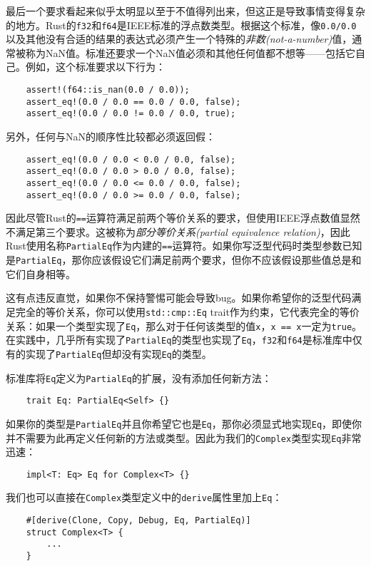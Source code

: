 最后一个要求看起来似乎太明显以至于不值得列出来，但这正是导致事情变得复杂的地方。Rust的\texttt{f32}和\texttt{f64}是IEEE标准的浮点数类型。根据这个标准，像\texttt{0.0/0.0}以及其他没有合适的结果的表达式必须产生一个特殊的\emph{非数(not-a-number)}值，通常被称为NaN值。标准还要求一个NaN值必须和其他任何值都不想等——包括它自己。例如，这个标准要求以下行为：
\begin{verbatim}
    assert!(f64::is_nan(0.0 / 0.0));
    assert_eq!(0.0 / 0.0 == 0.0 / 0.0, false);
    assert_eq!(0.0 / 0.0 != 0.0 / 0.0, true);
\end{verbatim}

另外，任何与NaN的顺序性比较都必须返回假：
\begin{verbatim}
    assert_eq!(0.0 / 0.0 < 0.0 / 0.0, false);
    assert_eq!(0.0 / 0.0 > 0.0 / 0.0, false);
    assert_eq!(0.0 / 0.0 <= 0.0 / 0.0, false);
    assert_eq!(0.0 / 0.0 >= 0.0 / 0.0, false);
\end{verbatim}

因此尽管Rust的\texttt{==}运算符满足前两个等价关系的要求，但使用IEEE浮点数值显然不满足第三个要求。这被称为\emph{部分等价关系(partial equivalence relation)}，因此Rust使用名称\texttt{PartialEq}作为内建的\texttt{==}运算符。如果你写泛型代码时类型参数已知是\texttt{PartialEq}，那你应该假设它们满足前两个要求，但你不应该假设那些值总是和它们自身相等。

这有点违反直觉，如果你不保持警惕可能会导致bug。如果你希望你的泛型代码满足完全的等价关系，你可以使用\texttt{std::cmp::Eq} trait作为约束，它代表完全的等价关系：如果一个类型实现了\texttt{Eq}，那么对于任何该类型的值\texttt{x}，\texttt{x == x}一定为\texttt{true}。在实践中，几乎所有实现了\texttt{PartialEq}的类型也实现了\texttt{Eq}，\texttt{f32}和\texttt{f64}是标准库中仅有的实现了\texttt{PartialEq}但却没有实现\texttt{Eq}的类型。

标准库将\texttt{Eq}定义为\texttt{PartialEq}的扩展，没有添加任何新方法：
\begin{verbatim}
    trait Eq: PartialEq<Self> {}
\end{verbatim}

如果你的类型是\texttt{PartialEq}并且你希望它也是\texttt{Eq}，那你必须显式地实现\texttt{Eq}，即使你并不需要为此再定义任何新的方法或类型。因此为我们的\texttt{Complex}类型实现\texttt{Eq}非常迅速：
\begin{verbatim}
    impl<T: Eq> Eq for Complex<T> {}
\end{verbatim}

我们也可以直接在\texttt{Complex}类型定义中的\texttt{derive}属性里加上\texttt{Eq}：
\begin{verbatim}
    #[derive(Clone, Copy, Debug, Eq, PartialEq)]
    struct Complex<T> {
        ...
    }
\end{verbatim}

